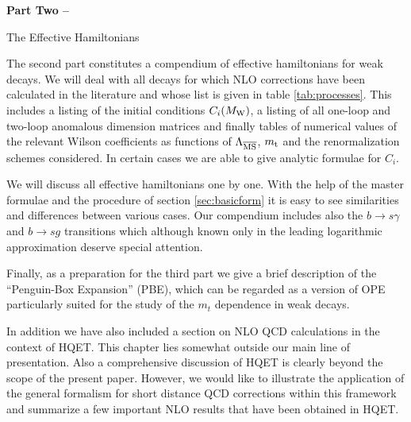 \skipevenpage

{\Huge\bf
\noindent
Part Two --

\bigskip
\bigskip
\bigskip

\noindent
The Effective Hamiltonians
}

\bigskip
\bigskip
\bigskip

\noindent
The second part constitutes a compendium of effective hamiltonians for
weak decays.  We will deal with all decays for which NLO corrections
have been calculated in the literature and whose list is given in table
\ref{tab:processes}. This includes a listing of the initial conditions
$C_i (M_{\rm W})$, a listing of all one-loop and two-loop anomalous dimension
matrices and finally tables of numerical values of the relevant Wilson
coefficients as functions of $\Lambda_{\overline{\rm MS}}$, $m_{\rm t}$ and the renormalization
schemes considered.  In certain cases we are able to give analytic
formulae for $C_i$.

We will discuss all effective hamiltonians one by one. With the help of the
master formulae and the procedure of section \ref{sec:basicform} it is
easy to see similarities and differences between various cases.  Our
compendium includes also the $b \to s\gamma$ and $b\to s g$ transitions
which although known only in the leading logarithmic approximation
deserve special attention.

Finally, as a preparation for the third part we give a brief
description of the ``Penguin-Box Expansion'' (PBE), which can be
regarded as a version of OPE particularly suited for the study of the
$m_t$ dependence in weak decays.

In addition we have also included a section on NLO QCD calculations in
the context of HQET. This chapter lies somewhat outside our main line of
presentation. Also a comprehensive discussion of HQET is clearly beyond
the scope of the present paper. However, we would like to illustrate the
application of the general formalism for short distance QCD corrections
within this framework and summarize a few important NLO results that
have been obtained in HQET.
